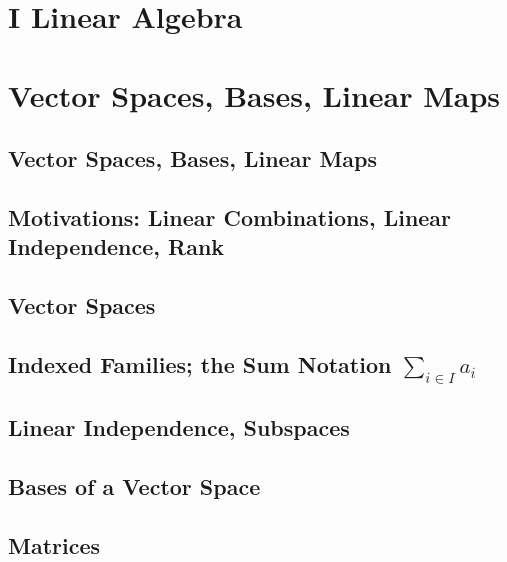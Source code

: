 \documentclass[a4paper]{article}
\begin{document}
\section*{I Linear Algebra}
\section{Vector Spaces, Bases, Linear Maps}
\subsection{ Vector Spaces, Bases, Linear Maps} %

\subsection{ Motivations: Linear Combinations, Linear Independence, Rank} %

\subsection{ Vector Spaces} %

\subsection{ Indexed Families; the Sum Notation $\sum_{i \in I}a_i$} %

\subsection{ Linear Independence, Subspaces} %

\subsection{ Bases of a Vector Space} %

\subsection{ Matrices} %
\end{document}
